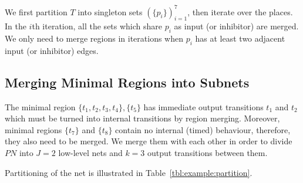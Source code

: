\documentclass[a4paper,11pt,twoside,openright]{memoir}
\newcommand*{\PN}{\textit{PN}}
\theoremstyle{my}
\begin{document}
We first partition $T$ into singleton sets $(\{p_i\})_{i = 1}^7$, then
iterate over the places. In the $i$th iteration, all the sets which
share $p_i$ as input (or inhibitor) are merged. We only need to merge
regions in iterations when $p_i$ has at least two adjacent input (or
inhibitor) edges.

\subsection{Merging Minimal Regions into Subnets}

The minimal region $\{t_1, t_2, t_3, t_4\}, \{t_5\}$ has immediate
output transitions $t_1$ and $t_2$ which must be turned into internal
transitions by region merging. Moreover, minimal regions $\{t_7\}$ and
$\{t_8\}$ contain no internal (timed) behaviour, therefore, they also
need to be merged. We merge them with each other in order to divide
$\PN$ into $J = 2$ low-level nets and $k = 3$ output transitions
between them.

Partitioning of the net is illustrated in
Table~\ref{tbl:example:partition}.
\end{document}
